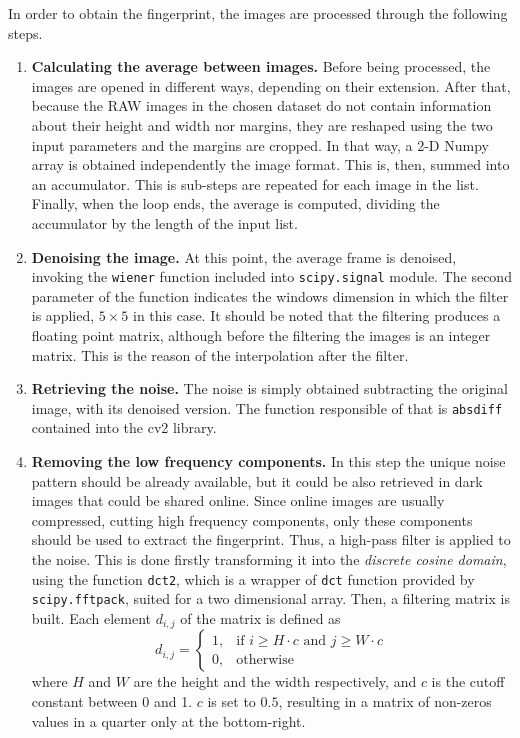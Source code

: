 In order to obtain the fingerprint, the images are processed through the following steps.
\begin{enumerate}
\item \textbf{Calculating the average between images.}
        Before being processed, the images are opened in different ways, depending on their extension. After that, because the RAW images in the chosen dataset do not contain information about their height and width nor margins, they are reshaped using the two input parameters and the margins are cropped. In that way, a 2-D Numpy array is obtained independently the image format. This is, then, summed into an accumulator. This is sub-steps are repeated for each image in the list. Finally, when the loop ends, the average is computed, dividing the accumulator by the length of the input list.
\item \textbf{Denoising the image.}
        At this point, the average frame is denoised, invoking the \texttt{wiener} function included into \texttt{scipy.signal} module. The second parameter of the function indicates the windows dimension in which the filter is applied, $5\times5$ in this case. It should be noted that the filtering produces a floating point matrix, although before the filtering the images is an integer matrix. This is the reason of the interpolation after the filter.
\item \textbf{Retrieving the noise.}
        The noise is simply obtained subtracting the original image, with its denoised version. The function responsible of that is \texttt{absdiff} contained into the cv2 library.
\item \textbf{Removing the low frequency components.}
        In this step the unique noise pattern should be already available, but it could be also retrieved in dark images that could be shared online. Since online images are usually compressed, cutting high frequency components, only these components should be used to extract the fingerprint. Thus, a high-pass filter is applied to the noise. This is done firstly transforming it into the \emph{discrete cosine domain}, using the function \texttt{dct2}, which is a wrapper of \texttt{dct} function provided by \texttt{scipy.fftpack}, suited for a two dimensional array. Then, a filtering matrix is built. Each element $d_{i,j}$ of the matrix is defined as
        \begin{equation}
          d_{i,j} = \begin{cases} 1, & \mbox{if } i \geq H \cdot c \mbox{ and } j \geq W \cdot c\\ 0, & \mbox{otherwise} \end{cases}
        \end{equation}
        where $H$ and  $W$ are the height and the width respectively, and $c$ is the cutoff constant between 0 and 1.
        $c$ is set to $0.5$, resulting in a matrix of non-zeros values in a quarter only at the bottom-right.


\end{enumerate}
